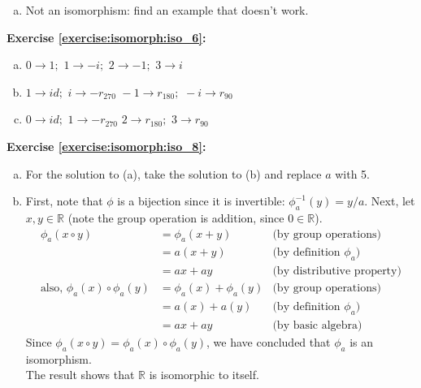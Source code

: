 \begin{enumerate}[(a)]
\item
Not an isomorphism: find an example that doesn't work.

\end{enumerate}

\noindent\textbf{Exercise \ref{exercise:isomorph:iso_6}:}

\begin{enumerate}[(a)]
\item
$ 0 \rightarrow 1;\,\,1\rightarrow -i; \,\,2 \rightarrow -1;\,\, 3 \rightarrow i$

\item
$ 1 \rightarrow id;\,\,i \rightarrow -r_{270} \,\,-1 \rightarrow r_{180};\,\, -i \rightarrow r_{90}$

\item
$ 0 \rightarrow id;\,\,1 \rightarrow -r_{270} \,\,2 \rightarrow r_{180};\,\, 3 \rightarrow r_{90}$
\end{enumerate}

\noindent\textbf{Exercise \ref{exercise:isomorph:iso_8}:}
\begin{enumerate}[(a)]
\item
For the solution to (a), take the solution to (b) and replace $a$ with 5.
\item
First, note that $\phi$ is a bijection since it is invertible:  $\phi_a^{-1}(y) = y/a$.
Next, let $x,y \in {\mathbb R}$ (note the group operation is addition, since $ 0 \in {\mathbb R}$).
\begin{align*}
\phi_a(x \circ y) &= \phi_a(x + y) &\text{(by group operations)}
\\
&= a(x + y) &\text{(by definition\ } \phi_a)
\\
&= ax + ay &\text{(by distributive property)}
\\
\text{also,\ } \phi_a(x) \circ \phi_a(y) &= \phi_a(x) + \phi_a(y) &\text{(by group operations)}
\\
&= a(x) + a(y) &\text{(by definition\ } \phi_a)
\\
&= ax + ay &\text{(by basic algebra)}
\end{align*}
Since $\phi_a(x \circ y) = \phi_a(x) \circ \phi_a(y)$, we have concluded that $\phi_a$ is an isomorphism.
\\
The result shows that ${\mathbb R}$ is isomorphic to itself.
\\
\end{enumerate}

